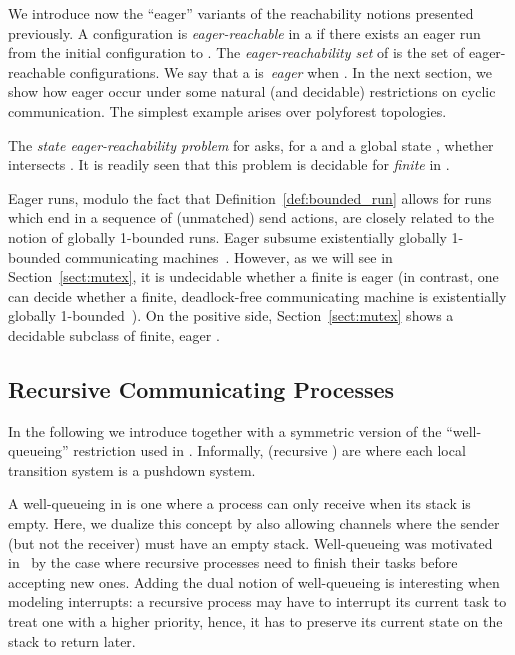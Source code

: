 \documentclass{LMCS}
\begin{document}
We introduce now the ``eager'' variants of the reachability notions
presented previously.  A configuration  is
\emph{eager-reachable} in a \qcp  if there exists an eager run
from the initial configuration  to .  The
\emph{eager-reachability set} of  is the set
 of eager-reachable configurations.  We say that
a \qcp  is~\emph{eager} when . In the next section, we show how eager \qcp 
occur under some natural (and decidable) restrictions on cyclic
communication. The simplest example arises over polyforest
topologies. 



The \emph{state eager-reachability problem} for \qcp
asks, for a \qcp  and a global state , whether  intersects .  It is readily seen that this problem is decidable for
\emph{finite} \qcp in \pspace.

Eager runs, modulo the fact that Definition~\ref{def:bounded_run}
allows for runs which end in a sequence of (unmatched) send actions,
are closely related to the notion of globally 1-bounded runs. Eager
\qcp subsume existentially globally 1-bounded communicating
machines~\cite{lohrey-m-2004-160-a,genest-b-2007-1-a}. However, as we
will see in Section~\ref{sect:mutex}, it is undecidable whether a
finite \qcp is eager (in contrast, one can decide whether a finite,
deadlock-free communicating machine is existentially globally 1-bounded~\cite{genest-b-2007-1-a}). On the
positive side, Section~\ref{sect:mutex} shows a decidable subclass of
finite, eager \qcp.







 \subsection{Recursive Communicating Processes}\label{ssec:rqcp}

In the following we introduce \rqcp together with a symmetric version
of the ``well-queueing'' restriction used in
\cite{latorre-s-2008-299-a}.
Informally, \rqcp (recursive \qcp) are  \qcp where each local
transition system is a pushdown system.


A well-queueing \rqcp in
\cite{latorre-s-2008-299-a} is one where a process can only receive
when its stack is empty. Here, we dualize this concept by also allowing
channels where the sender (but not the receiver) must have an empty
stack. Well-queueing was motivated
in~\cite{latorre-s-2008-299-a} by the case where recursive processes
need to finish their tasks before accepting new ones. Adding the dual notion
of well-queueing is interesting when modeling interrupts: a
recursive process may have to interrupt its current task to treat one
with a higher priority, hence, it has to preserve its current state on
the stack to return later.
\end{document}
